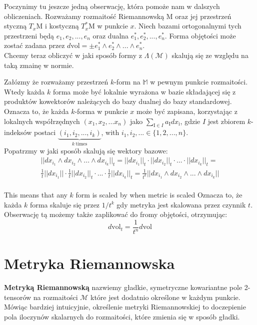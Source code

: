 \documentclass[licencjacka]{pracamgr}
\theoremstyle{definition}
\theoremstyle{definition}
\theoremstyle{plain}
\theoremstyle{plain}
\begin{document}
Poczynimy tu jeszcze jedną obserwację, która pomoże nam w dalszych obliczeniach.
Rozważamy rozmaitość Riemannowską 
$\mathrm{M}$  oraz jej przestrzeń styczną 
$T_x\mathrm{M}$ i kostyczną $T_x^\ast\mathrm{M}$ 
w punkcie $x$. 
Niech bazami ortogonalnymi tych przestrzeni będą
$e_1, e_2, ..., e_n$ oraz dualna
$e_1^\ast, e_2^\ast, ..., e_n^\ast$. 
Forma objętości może zostać zadana przez
$d\mathrm{vol} = \pm e_1^\ast \wedge e_2^\ast \wedge
... \wedge e_n^\ast $. \\

Chcemy teraz obliczyć w jaki sposób formy z 
$\Lambda(\mathcal{M})$ skalują się ze względu na taką zmainę w normie.

Załózmy że rozważamy przestrzeń $k$-form na
$\mathbb{M}$ 
w pewnym punkcie rozmaitości. Wtedy każda $k$ forma może być lokalnie
wyrażona w bazie składającej się z produktów kowektorów należących 
do bazy dualnej do bazy standardowej. Oznacza to, że każda $k$-forma
w punkcie $x$ może być zapisana, korzystając z lokalnych współrzędnych
$(x_1, x_2, ... x_n)$ jako $ \sum_{\mathrm{I} \in I } a_\mathrm{I} dx_\mathrm{i}$,
gdzie $I$ jest zbiorem $k$-indeksów postaci
$\underbrace{(i_1, i_2, ..., i_k)}_{k~\mathrm{times}}$, with $i_1,
i_2, ... \in \{1, 2, ..., n \}$.   \\

Popatrzmy w jaki sposób skalują się wektory bazowe:
\begin{multline*}
    ||dx_{i_1} \wedge dx_{i_2} \wedge ... \wedge dx_{i_k} ||_t =  
    ||dx_{i_1} ||_t \cdot ||  dx_{i_2} ||_t \cdot ... \cdot || dx_{i_k} ||_t =  \\
    \frac{1}{t}||dx_{i_1} || \cdot \frac{1}{t} ||  dx_{i_2} ||_t \cdot ...
     \cdot \frac{1}{t} || dx_{i_k} ||_t = 
    \frac{1}{t^k}||dx_{i_1} \wedge dx_{i_2} \wedge ... \wedge dx_{i_k} ||
\end{multline*} \\

This means that any $k$ form is scaled by  when metric is scaled
Oznacza to, że każda $k$ forma skaluje się przez $1/t^k$ gdy metryka jest
skalowana przez czynnik $t$.
Obserwację tą możemy także zaplikować do fromy objętości, otrzymując:
\[
d\mathrm{vol}_t = \frac{1}{t^n} d\mathrm{vol}
\]

\section{Metryka Riemannowska}

\textbf{Metryką Riemannowską} nazwiemy gładkie, symetryczne kowariantne
pole 2-tensorów na rozmaitości
$\mathcal{M}$ które jest dodatnio określone w każdym punkcie. Mówiąc bardziej
intuicyjnie, określenie metryki Riemannowskiej to doczepienie 
pola iloczynów skalarnych do rozmaitości, które zmienia się w sposób gładki.
\\
\end{document}
